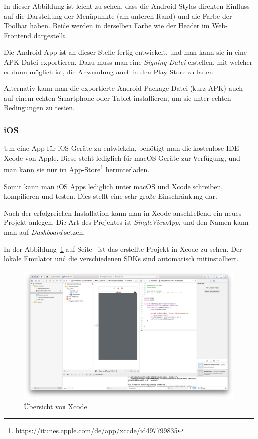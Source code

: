 In dieser Abbildung ist leicht zu sehen, dass die Android-Styles direkten Einfluss auf die Darstellung der Menüpunkte
(am unteren Rand) und die Farbe der Toolbar haben. Beide werden in derselben Farbe wie der Header im Web-Frontend
dargestellt.

Die Android-App ist an dieser Stelle fertig entwickelt, und man kann sie in eine APK-Datei exportieren. Dazu muss man
eine \textit{Signing-Datei} erstellen, mit welcher es dann möglich ist, die Anwendung auch in den Play-Store zu laden.

Alternativ kann man die exportierte Android Package-Datei (kurz APK) auch auf einem echten Smartphone oder Tablet
installieren, um sie unter echten Bedingungen zu testen.

\subsubsection{iOS}
Um eine App für iOS Geräte zu entwickeln, benötigt man die kostenlose IDE Xcode von Apple. Diese steht lediglich für
macOS-Geräte zur Verfügung, und man kann sie nur im
App-Store\footnote{https://itunes.apple.com/de/app/xcode/id497799835} herunterladen.

Somit kann man iOS Apps lediglich unter macOS und Xcode schreiben, kompilieren und testen. Dies stellt eine sehr große
Einschränkung dar.

Nach der erfolgreichen Installation kann man in Xcode anschließend ein neues Projekt anlegen. Die Art des Projektes ist
\textit{SingleViewApp}, und den Namen kann man auf \textit{Dashboard} setzen.

In der Abbildung~\ref{fig:umsetzung_ios_ide} auf Seite~\pageref{fig:umsetzung_ios_ide} ist das erstellte Projekt in
Xcode zu sehen. Der lokale Emulator und die verschiedenen SDKs sind automatisch mitinstalliert.

\begin{figure}[h]
    \centering
    \includegraphics[width=\textwidth]{images/kapitel_4/ios_ide.png}
    \caption{Übersicht von Xcode}
    \label{fig:umsetzung_ios_ide}
\end{figure}

